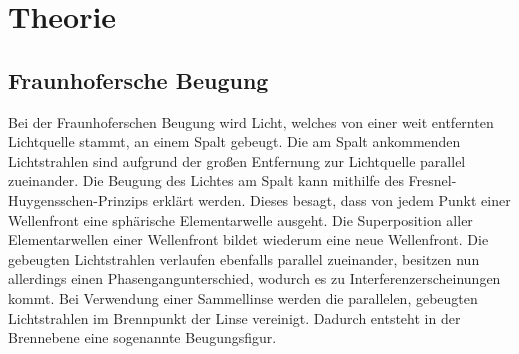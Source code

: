 
\section{Theorie}
%
\subsection{Fraunhofersche Beugung}
Bei der Fraunhoferschen Beugung wird Licht, welches von einer weit entfernten Lichtquelle stammt, an einem Spalt gebeugt. Die am Spalt ankommenden Lichtstrahlen sind aufgrund der großen Entfernung zur Lichtquelle parallel zueinander.
Die Beugung des Lichtes am Spalt kann mithilfe des Fresnel-Huygensschen-Prinzips erklärt werden. Dieses besagt, dass von jedem Punkt einer Wellenfront eine sphärische Elementarwelle ausgeht. Die Superposition aller Elementarwellen einer Wellenfront bildet wiederum eine neue Wellenfront.
Die gebeugten Lichtstrahlen verlaufen ebenfalls parallel zueinander, besitzen nun allerdings einen Phasengangunterschied, wodurch es zu Interferenzerscheinungen kommt. Bei Verwendung einer Sammellinse werden die parallelen, gebeugten Lichtstrahlen im Brennpunkt der Linse vereinigt. Dadurch entsteht in der Brennebene eine sogenannte Beugungsfigur. 
%

